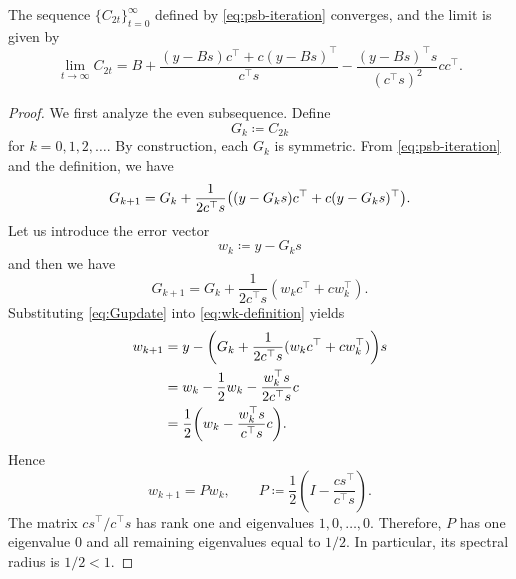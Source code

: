 \documentclass[0_en]{subfiles}
\begin{document}
\begin{proposition}\label{prop:psb-convergence}
    The sequence $\{ C_{2t} \}_{t=0}^{\infty}$ defined by \cref{eq:psb-iteration} converges, and the limit is given by
    \begin{equation}\label{eq:psb-limit}
        \lim_{t \to \infty} C_{2t}
        = B + \frac{(y - Bs)c^\top + c(y - Bs)^\top}{c^\top s} - \frac{(y - Bs)^\top s}{(c^\top s)^2} c c^\top.
    \end{equation}
\end{proposition}
\begin{proof}
    We first analyze the even subsequence.
    Define
    \begin{equation*}
        G_k \coloneqq C_{2k}
    \end{equation*}
    for $k=0,1,2,\dots$.
    By construction, each $G_k$ is symmetric.
    From \cref{eq:psb-iteration} and the definition, we have
    \begin{equation*}
        G_{k+1} = G_k +\frac{1}{2c^\top s}\qty((y-G_k s)c^\top+c(y-G_k s)^\top).
    \end{equation*}
    Let us introduce the error vector
    \begin{equation}\label{eq:wk-definition}
        w_k \coloneqq y-G_k s
    \end{equation}
    and then we have
    \begin{equation}\label{eq:Gupdate}
        G_{k+1} = G_k+\frac{1}{2c^\top s}(w_k c^\top+cw_k^\top).
    \end{equation}
    Substituting \cref{eq:Gupdate} into \cref{eq:wk-definition} yields
    \begin{align}
        w_{k+1} & = y-\qty(G_k+\frac{1}{2c^\top s}(w_k c^\top+cw_k^\top))s \\
                & =
        w_k-\frac12w_k-\frac{w_k^\top s}{2c^\top s}c                       \\
                & =
        \frac{1}{2}\qty(w_k-\frac{w_k^\top s}{c^\top s}c).
    \end{align}
    Hence
    \begin{equation}
        w_{k+1}=Pw_k,
        \qquad
        P \coloneqq \frac{1}{2}\left(I-\frac{cs^\top}{c^\top s}\right).
    \end{equation}
    The matrix $cs^\top/c^\top s$ has rank one and eigenvalues $1,0,\dots,0$.
    Therefore, $P$ has one eigenvalue $0$ and all remaining eigenvalues equal to $1/2$.
    In particular, its spectral radius is $1/2<1$.

\end{proof}
\end{document}
